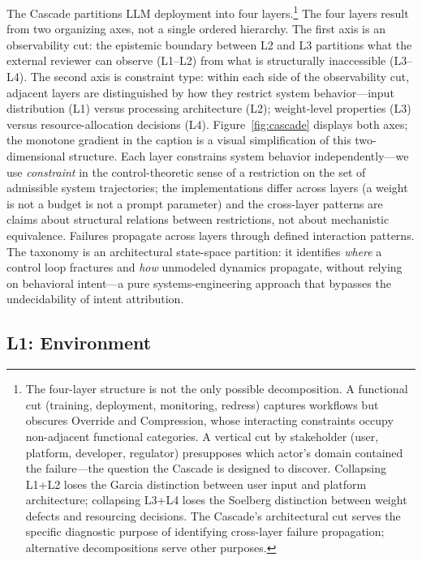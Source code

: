 \documentclass[11pt]{article}
\begin{document}
The Cascade partitions LLM deployment into four layers.\footnote{The four-layer structure is not the only possible decomposition. A functional cut (training, deployment, monitoring, redress) captures workflows but obscures Override and Compression, whose interacting constraints occupy non-adjacent functional categories. A vertical cut by stakeholder (user, platform, developer, regulator) presupposes which actor's domain contained the failure---the question the Cascade is designed to discover. Collapsing L1+L2 loses the Garcia distinction between user input and platform architecture; collapsing L3+L4 loses the Soelberg distinction between weight defects and resourcing decisions. The Cascade's architectural cut serves the specific diagnostic purpose of identifying cross-layer failure propagation; alternative decompositions serve other purposes.} The four layers result from two organizing axes, not a single ordered hierarchy. The first axis is an observability cut: the epistemic boundary between L2 and L3 partitions what the external reviewer can observe (L1--L2) from what is structurally inaccessible (L3--L4). The second axis is constraint type: within each side of the observability cut, adjacent layers are distinguished by how they restrict system behavior---input distribution (L1) versus processing architecture (L2); weight-level properties (L3) versus resource-allocation decisions (L4). Figure~\ref{fig:cascade} displays both axes; the monotone gradient in the caption is a visual simplification of this two-dimensional structure. Each layer constrains system behavior independently---we use \textit{constraint} in the control-theoretic sense of a restriction on the set of admissible system trajectories; the implementations differ across layers (a weight is not a budget is not a prompt parameter) and the cross-layer patterns are claims about structural relations between restrictions, not about mechanistic equivalence. Failures propagate across layers through defined interaction patterns. The taxonomy is an architectural state-space partition: it identifies \textit{where} a control loop fractures and \textit{how} unmodeled dynamics propagate, without relying on behavioral intent---a pure systems-engineering approach that bypasses the undecidability of intent attribution.

\subsection{L1: Environment}
\end{document}
